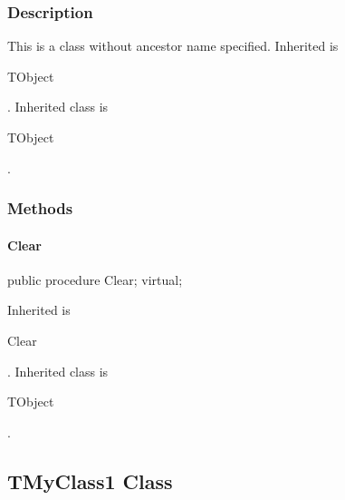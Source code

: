 \documentclass{report}
\newif\ifpdf
\begin{document}
\subsubsection*{\large{\textbf{Description}}\normalsize\hspace{1ex}\hfill}
This is a class without ancestor name specified. Inherited is \begin{ttfamily}TObject\end{ttfamily}. Inherited class is \begin{ttfamily}TObject\end{ttfamily}.\subsubsection*{\large{\textbf{Methods}}\normalsize\hspace{1ex}\hfill}
\paragraph*{Clear}\hspace*{\fill}

\label{warning_inherited_test.TMyClass0-Clear}
\begin{list}{}{
\setlength{\itemindent}{0cm}
\setlength{\listparindent}{0cm}
\setlength{\leftmargin}{\evensidemargin}
\addtolength{\leftmargin}{\tmplength}
\settowidth{\labelsep}{X}
\addtolength{\leftmargin}{\labelsep}
\setlength{\labelwidth}{\tmplength}
}
\item[\textbf{Declaration}\hfill]
\ifpdf
\begin{flushleft}
\fi
\begin{ttfamily}
public procedure Clear; virtual;\end{ttfamily}

\ifpdf
\end{flushleft}
\fi

\par
\item[\textbf{Description}]
Inherited is \begin{ttfamily}Clear\end{ttfamily}. Inherited class is \begin{ttfamily}TObject\end{ttfamily}.

\end{list}
\ifpdf
\subsection*{\large{\textbf{TMyClass1 Class}}\normalsize\hspace{1ex}\hrulefill}
\else
\end{document}
